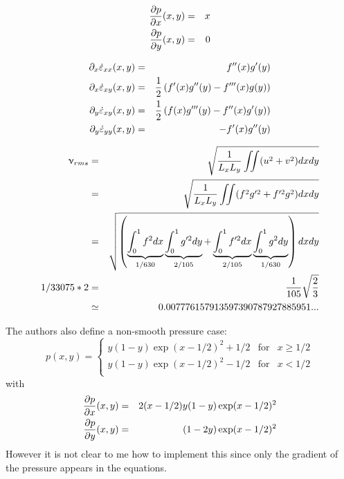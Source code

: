 \begin{eqnarray}
\frac{\partial p}{\partial x} (x,y)&=& x\nonumber\\
\frac{\partial p}{\partial y} (x,y)&=& 0\nonumber
\end{eqnarray}

\begin{eqnarray}
\partial_x \dot\varepsilon_{xx} (x,y)&=&  f''(x)g'(y) \nonumber\\
\partial_x \dot\varepsilon_{xy} (x,y)&=& \frac12\left(f'(x)g''(y)-f'''(x)g(y)\right)\nonumber\\
\partial_y \dot\varepsilon_{xy} (x,y)&=& \frac12\left(f(x)g'''(y)-f''(x)g'(y) \right)\nonumber\\
\partial_y \dot\varepsilon_{yy} (x,y)&=& -f'(x)g''(y) \nonumber
\end{eqnarray}

\begin{eqnarray}
\upnu_{rms}
&=& \sqrt{ \frac{1}{L_xL_y} \iint (u^2+v^2) dxdy   } \nonumber\\
&=& \sqrt{ \frac{1}{L_xL_y} \iint (f^2g'^2+f'^2g^2) dxdy   } \nonumber\\
&=& \sqrt{ \left( 
\underbrace{\int_0^1 f^2 dx}_{1/630} 
\underbrace{\int_0^1 g'^2 dy}_{2/105}
+ 
\underbrace{\int_0^1 f'^2 dx }_{2/105}
\underbrace{\int_0^1g^2dy}_{1/630} \right) dxdy} \nonumber\\
1/33075 * 2
&=& \frac{1}{105}\sqrt{\frac23} \nonumber\\
&\simeq&  0.007776157913597390787927885951... 
\end{eqnarray}

The authors also define a non-smooth pressure case:
\[
p(x,y)=
\left\{
\begin{array}{lll}
y(1-y)\exp(x-1/2)^2+1/2 & \text{for}& x\ge 1/2 \\
y(1-y)\exp(x-1/2)^2-1/2 & \text{for}& x< 1/2 \\
\end{array}
\right.
\]
with 
\begin{eqnarray}
\frac{\partial p}{\partial x} (x,y)&=& 2(x-1/2)y(1-y)\exp(x-1/2)^2 \nonumber\\
\frac{\partial p}{\partial y} (x,y)&=& (1-2y) \exp(x-1/2)^2 \nonumber
\end{eqnarray}
However it is not clear to me how to implement this since only the gradient of the pressure appears 
in the equations. 



